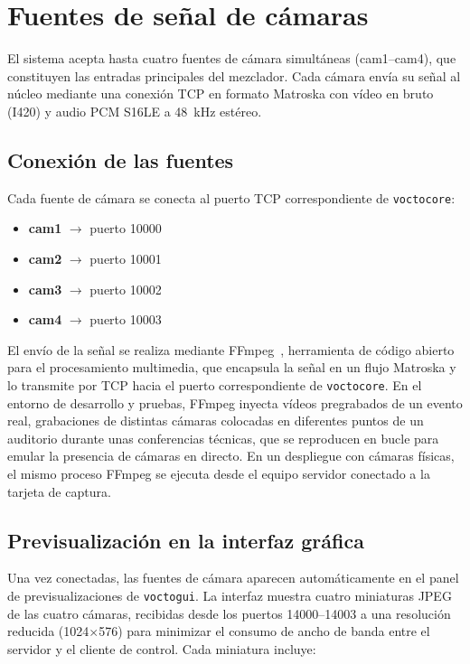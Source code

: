 \section{Fuentes de señal de cámaras}
\label{sec:fuentes_camaras}

El sistema acepta hasta cuatro fuentes de cámara simultáneas (cam1--cam4), que
constituyen las entradas principales del mezclador. Cada cámara envía su señal al
núcleo mediante una conexión TCP en formato Matroska con vídeo en bruto (I420) y audio
PCM S16LE a 48~kHz estéreo.

\subsection{Conexión de las fuentes}

Cada fuente de cámara se conecta al puerto TCP correspondiente de \texttt{voctocore}:

\begin{itemize}
  \item \textbf{cam1} $\rightarrow$ puerto 10000
  \item \textbf{cam2} $\rightarrow$ puerto 10001
  \item \textbf{cam3} $\rightarrow$ puerto 10002
  \item \textbf{cam4} $\rightarrow$ puerto 10003
\end{itemize}

El envío de la señal se realiza mediante FFmpeg~\cite{ffmpeg_project}, herramienta de
código abierto para el procesamiento multimedia, que encapsula la señal en un flujo
Matroska y lo transmite por TCP hacia el puerto correspondiente de \texttt{voctocore}. En el
entorno de desarrollo y pruebas, FFmpeg inyecta vídeos pregrabados de un evento real,
grabaciones de distintas cámaras colocadas en diferentes puntos de un auditorio durante
unas conferencias técnicas, que se reproducen en bucle para emular la presencia de
cámaras en directo. En un despliegue con cámaras físicas, el mismo proceso FFmpeg se
ejecuta desde el equipo servidor conectado a la tarjeta de captura.

\subsection{Previsualización en la interfaz gráfica}

Una vez conectadas, las fuentes de cámara aparecen automáticamente en el panel de
previsualizaciones de \texttt{voctogui}. La interfaz muestra cuatro miniaturas JPEG de las
cuatro cámaras, recibidas desde los puertos 14000--14003 a una resolución reducida
(1024$\times$576) para minimizar el consumo de ancho de banda entre el servidor y el cliente
de control. Cada miniatura incluye:

